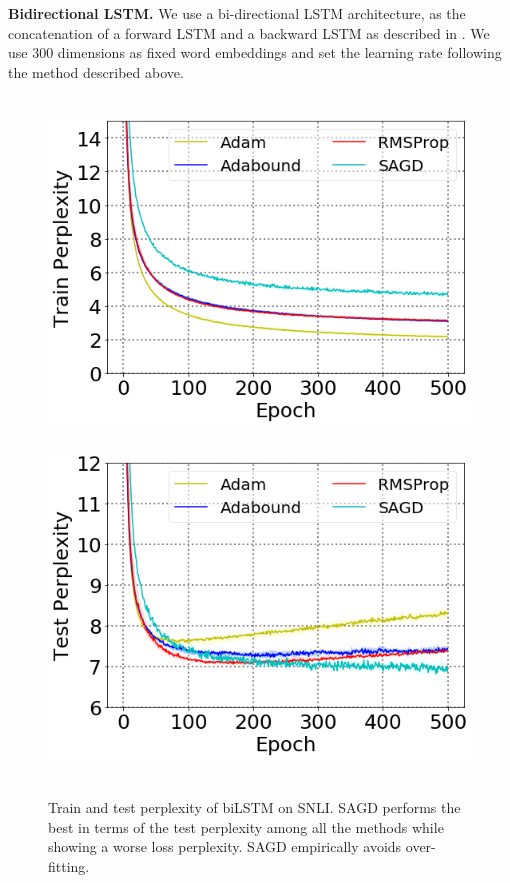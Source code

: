\documentclass[11pt]{article}
\begin{document}
\begin{table}[H]
\caption{ Test Perplexity of LSTMs on Penn Treebank. Bold number indicates the best result.}\label{tab:ppl}
\end{table}


\textbf{Bidirectional LSTM.}
We use a bi-directional LSTM architecture, as the concatenation of a forward LSTM and a backward LSTM as described in \citep{conneau2017supervised}.
We use $300$ dimensions as fixed word embeddings and set the learning rate following the method described above.
\begin{figure}[H] 
 \mbox{
\includegraphics[width = 0.48 \textwidth ]{figure/new/bilstmtrainwithlap.png}
\includegraphics[width = 0.48 \textwidth ]{figure/new/bilstmtestwithlap.png}
 }
 \vspace{-0.1in}
 \caption[]{Train and test perplexity of biLSTM on SNLI. 
 \textsc{SAGD} performs the best in terms of the test perplexity among all the methods while showing a worse loss perplexity. SAGD empirically avoids over-fitting.
} 
 \label{fig:snli}\vspace{-0.05in}
\end{figure}
\end{document}
